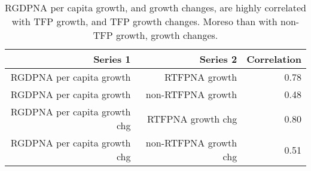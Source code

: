 \begin{table}[ht]
\centering
\begin{tabular}{rrr}
  \hline
Series 1 & Series 2 & Correlation \\ 
  \hline
RGDPNA per capita growth & RTFPNA growth & 0.78 \\ 
  RGDPNA per capita growth & non-RTFPNA growth & 0.48 \\ 
  RGDPNA per capita growth chg & RTFPNA growth chg & 0.80 \\ 
  RGDPNA per capita growth chg & non-RTFPNA growth chg & 0.51 \\ 
   \hline
\end{tabular}
\caption{RGDPNA per capita growth, and growth changes, are highly correlated with TFP growth, and TFP growth changes. Moreso than with non-TFP growth, growth changes.} 
\end{table}
